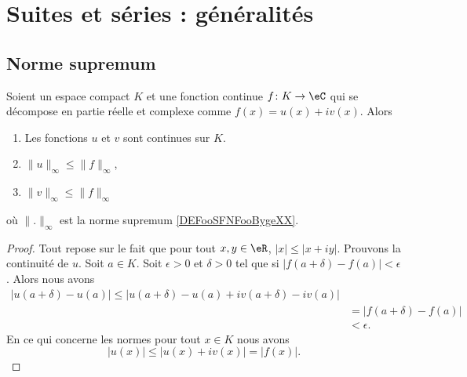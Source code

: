 
\section{Suites et séries : généralités}
\label{SECooTDZNooJvjPks}

\subsection{Norme supremum}


\begin{lemma}       \label{LEMooLPRZooUPsWTR}
	Soient un espace compact \( K\) et une fonction continue \( f\colon K\to \eC\) qui se décompose en partie réelle et complexe comme \( f(x)=u(x)+iv(x)\). Alors
	\begin{enumerate}
		\item
		      Les fonctions \( u\) et \( v\) sont continues sur \( K\).
		\item
		      \( \| u \|_{\infty}\leq \| f \|_{\infty}\),
		\item
		      \( \| v \|_{\infty}\leq \| f \|_{\infty}\)
	\end{enumerate}
	où \( \| . \|_{\infty}\) est la norme supremum \ref{DEFooSFNFooBygeXX}.
\end{lemma}

\begin{proof}
	Tout repose sur le fait que pour tout \( x,y\in \eR\), \( | x |\leq | x+iy |\). Prouvons la continuité de \( u\). Soit \( a\in K\). Soit \( \epsilon>0\) et \( \delta>0\) tel que si \( | f(a+\delta)-f(a) |<\epsilon\). Alors nous avons
	\begin{subequations}
		\begin{align}
			| u(a+\delta)-u(a) |\leq | u(a+\delta)-u(a)+iv(a+\delta)-iv(a) | \\
			 & =| f(a+\delta)-f(a) |                                         \\
			 & <\epsilon.
		\end{align}
	\end{subequations}
	En ce qui concerne les normes pour tout \( x\in K\) nous avons
	\begin{equation}
		| u(x) |\leq | u(x)+iv(x) |=| f(x) |.
	\end{equation}
\end{proof}


